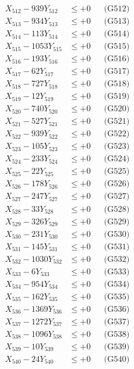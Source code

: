 \documentclass[a4paper,10pt]{article}
\begin{document}
{\begin{align}
X_{512} - 939Y_{512} &\leq +0 && \text{(G512)} \\
X_{513} - 934Y_{513} &\leq +0 && \text{(G513)} \\
X_{514} - 113Y_{514} &\leq +0 && \text{(G514)} \\
X_{515} - 1053Y_{515} &\leq +0 && \text{(G515)} \\
X_{516} - 193Y_{516} &\leq +0 && \text{(G516)} \\
X_{517} - 62Y_{517} &\leq +0 && \text{(G517)} \\
X_{518} - 727Y_{518} &\leq +0 && \text{(G518)} \\
X_{519} - 12Y_{519} &\leq +0 && \text{(G519)} \\
X_{520} - 740Y_{520} &\leq +0 && \text{(G520)} \\
\allowbreak
X_{521} - 527Y_{521} &\leq +0 && \text{(G521)} \\
X_{522} - 939Y_{522} &\leq +0 && \text{(G522)} \\
X_{523} - 105Y_{523} &\leq +0 && \text{(G523)} \\
X_{524} - 233Y_{524} &\leq +0 && \text{(G524)} \\
X_{525} - 22Y_{525} &\leq +0 && \text{(G525)} \\
X_{526} - 178Y_{526} &\leq +0 && \text{(G526)} \\
X_{527} - 247Y_{527} &\leq +0 && \text{(G527)} \\
X_{528} - 33Y_{528} &\leq +0 && \text{(G528)} \\
X_{529} - 326Y_{529} &\leq +0 && \text{(G529)} \\
X_{530} - 231Y_{530} &\leq +0 && \text{(G530)} \\
\allowbreak
X_{531} - 145Y_{531} &\leq +0 && \text{(G531)} \\
X_{532} - 1030Y_{532} &\leq +0 && \text{(G532)} \\
X_{533} - 6Y_{533} &\leq +0 && \text{(G533)} \\
X_{534} - 954Y_{534} &\leq +0 && \text{(G534)} \\
X_{535} - 162Y_{535} &\leq +0 && \text{(G535)} \\
X_{536} - 1369Y_{536} &\leq +0 && \text{(G536)} \\
X_{537} - 1272Y_{537} &\leq +0 && \text{(G537)} \\
X_{538} - 1096Y_{538} &\leq +0 && \text{(G538)} \\
X_{539} - 10Y_{539} &\leq +0 && \text{(G539)} \\
X_{540} - 24Y_{540} &\leq +0 && \text{(G540)} \\

\end{align}}
\end{document}
